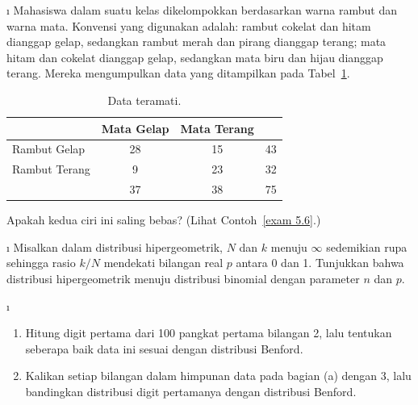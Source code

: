 \begin{LJSItem}
\i\label{exer 5.1.25} Mahasiswa dalam suatu kelas dikelompokkan berdasarkan warna
rambut dan warna mata. Konvensi yang digunakan adalah: rambut cokelat dan hitam
dianggap gelap, sedangkan rambut merah dan pirang dianggap terang; mata hitam dan
cokelat dianggap gelap, sedangkan mata biru dan hijau dianggap terang. Mereka
mengumpulkan data yang ditampilkan pada Tabel~\ref{table 5.6}.  
\begin{table}[t]
\centering
\begin{tabular}{|l|c|c|c|}
\hline
 & Mata Gelap & Mata Terang & \\ \hline 
Rambut Gelap  & 28              & 15 & \hspace{.25in} 43 \hspace{.25in}   \\ \hline 
Rambut Terang & \hspace{.1in}9  & 23 & \hspace{.25in} 32 \hspace{.25in}   \\ \hline
           & 37              & 38 & \hspace{.25in} 75 \hspace{.25in}   \\ \hline
\end{tabular}
\caption{Data teramati.}
\label{table 5.6}
\end{table}
Apakah kedua ciri ini saling bebas? (Lihat Contoh~\ref{exam 5.6}.)

\i\label{exer 5.1.124} Misalkan dalam distribusi hipergeometrik, $N$ dan $k$ menuju
$\infty$ sedemikian rupa sehingga rasio $k/N$ mendekati bilangan real $p$ antara
0 dan 1. Tunjukkan bahwa distribusi hipergeometrik menuju distribusi binomial dengan
parameter $n$ dan $p$.  

\i\label{exer 5.1.126}  
\begin{enumerate}
\item Hitung digit pertama dari 100 pangkat pertama bilangan 2, lalu tentukan seberapa
baik data ini sesuai dengan distribusi Benford.
\item Kalikan setiap bilangan dalam himpunan data pada bagian (a) dengan 3, lalu
bandingkan distribusi digit pertamanya dengan distribusi Benford.
\end{enumerate}


\end{LJSItem}
